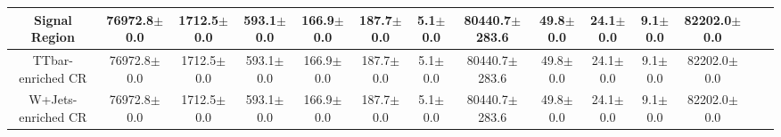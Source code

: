 \documentclass[10pt]{article}
\begin{document}
\begin{table}[p]
\begin{tabular}{|c|c|c|c|c|c|c|c|c|c|c|c|c|c|}
\hline 
\hline 
Signal Region & 76972.8$\pm$0.0 & 1712.5$\pm$0.0 & 593.1$\pm$0.0 & 166.9$\pm$0.0 & 187.7$\pm$0.0 & 5.1$\pm$0.0 & 80440.7$\pm$283.6 & 49.8$\pm$0.0 & 24.1$\pm$0.0 & 9.1$\pm$0.0 & 82202.0$\pm$0.0 & \\ 
\hline 
\hline 
TTbar-enriched CR & 76972.8$\pm$0.0 & 1712.5$\pm$0.0 & 593.1$\pm$0.0 & 166.9$\pm$0.0 & 187.7$\pm$0.0 & 5.1$\pm$0.0 & 80440.7$\pm$283.6 & 49.8$\pm$0.0 & 24.1$\pm$0.0 & 9.1$\pm$0.0 & 82202.0$\pm$0.0 & \\ 
\hline 
\hline 
W+Jets-enriched CR & 76972.8$\pm$0.0 & 1712.5$\pm$0.0 & 593.1$\pm$0.0 & 166.9$\pm$0.0 & 187.7$\pm$0.0 & 5.1$\pm$0.0 & 80440.7$\pm$283.6 & 49.8$\pm$0.0 & 24.1$\pm$0.0 & 9.1$\pm$0.0 & 82202.0$\pm$0.0 & \\ 
\hline 
\hline 
\hline 
\end{tabular} 
\end{table} 
\end{document}
